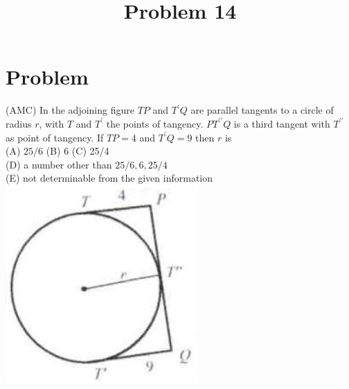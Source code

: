 \documentclass{article}
\title{Problem 14}
\date{}
\begin{document}
\maketitle

\section*{Problem}
(AMC) In the adjoining figure \(T P\) and \(T^{\prime} Q\) are parallel tangents to a circle of radius \(r\), with \(T\) and \(T^{\prime}\) the points of tangency. \(P T^{\prime \prime} Q\) is a third tangent with \(T^{\prime \prime}\) as point of tangency. If \(T P=4\) and \(T^{\prime} Q=9\) then \(r\) is\\
(A) \(25 / 6\) (B) 6 (C) 25/4\\
(D) a number other than \(25 / 6,6,25 / 4\)\\
(E) not determinable from the given information\\
\centering
\includegraphics[width=\textwidth]{images/156(2).jpg}
\end{document}
